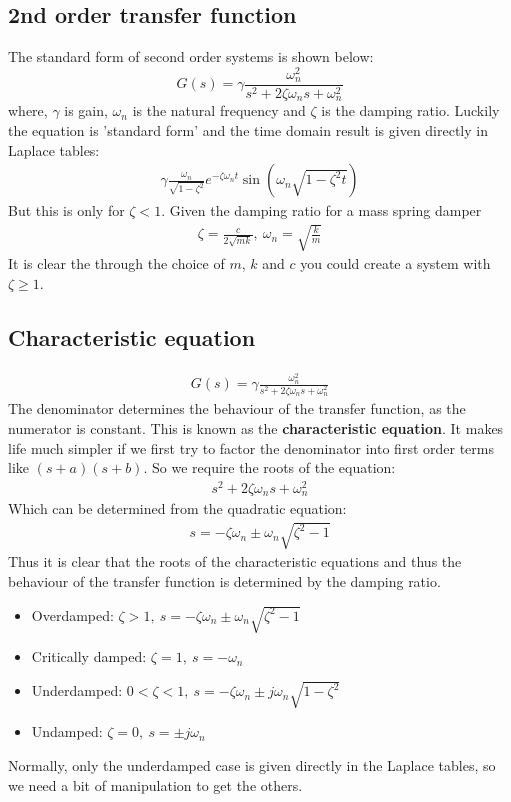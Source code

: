\subsection{2nd order transfer function}
The standard form of second order systems is shown below:
\begin{equation}
  G(s) = \gamma \frac{\omega_n^2}{s^2 + 2\zeta \omega_n s + \omega_n^2}
\end{equation}
where, $\gamma$ is gain, $\omega_n$ is the natural frequency and $\zeta$ is the damping ratio. Luckily the equation is 'standard form' and the time domain result is given directly in Laplace tables:
\begin{align}
  \gamma \frac{\omega_n}{\sqrt{1-\zeta^2}}e^{-\zeta \omega_n t} \sin{\left(\omega_n\sqrt{1-\zeta^2 t}\right)}
\end{align}
But this is only for $\zeta < 1$. Given the damping ratio for a mass spring damper
\begin{align}
  \zeta = \frac{c}{2\sqrt{mk}}, \ \omega_n = \sqrt{\frac{k}{m}}
\end{align}
It is clear the through the choice of $m$, $k$ and $c$ you could create a system with $\zeta \geq 1$.
\subsection{Characteristic equation}
\begin{align}
  G(s) = \gamma \frac{\omega_n^2}{s^2 + 2\zeta \omega_n s + \omega_n^2}
\end{align}
The denominator determines the behaviour of the transfer function, as the numerator is constant. This is known as the \textbf{characteristic equation}. It makes life much simpler if we first try to factor the denominator into first order terms like $(s+a)(s+b)$. So we require the roots of the equation:
\begin{align}
  s^2 + 2\zeta \omega_n s + \omega_n^2
\end{align}
Which can be determined from the quadratic equation:
\begin{align}
  s = -\zeta \omega_n \pm \omega_n \sqrt{\zeta^2 - 1}
\end{align}
Thus it is clear that the roots of the characteristic equations and thus the behaviour of the transfer function is determined by the damping ratio.
\begin{itemize}
  \item Overdamped: $\zeta > 1, \ s = -\zeta \omega_n \pm \omega_n \sqrt{\zeta^2 - 1}$
  \item Critically damped: $\zeta = 1, \ s = -\omega_n$
  \item Underdamped: $0 < \zeta < 1, \ s = -\zeta \omega_n \pm j \omega_n \sqrt{1-\zeta^2}$
  \item Undamped: $\zeta = 0, \ s = \pm j\omega_n$
\end{itemize}
Normally, only the underdamped case is given directly in the Laplace tables, so we need a bit of manipulation to get the others.
